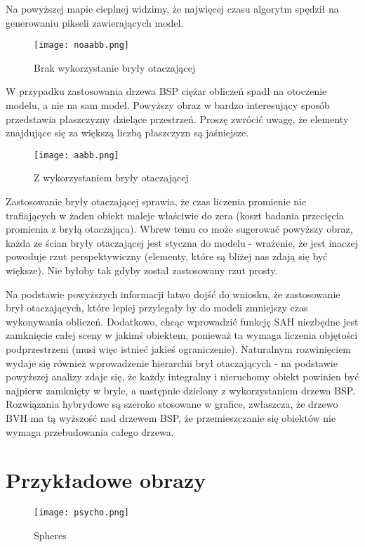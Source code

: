 Na powyższej mapie cieplnej widzimy, że najwięcej czasu algorytm spędził na generowaniu pikseli zawierających model.

\begin{figure}[h!]
\centering
  \caption{Brak wykorzystanie bryły otaczającej}
  \texttt{[image: noaabb.png]}
\end{figure}

W przypadku zastosowania drzewa BSP ciężar obliczeń spadł na otoczenie modelu, a nie na sam model. Powyższy obraz w bardzo interesujący sposób przedstawia płaszczyzny dzielące przestrzeń. Proszę zwrócić uwagę, że elementy znajdujące się za większą liczbą płaszczyzn są jaśniejsze. 

\begin{figure}[h!]
\centering
  \caption{Z wykorzystaniem bryły otaczającej}
  \texttt{[image: aabb.png]}
\end{figure}

Zastosowanie bryły otaczającej sprawia, że czas liczenia promienie nie trafiających w żaden obiekt maleje właściwie do zera (koszt badania przecięcia promienia z bryłą otaczająca). Wbrew temu co może sugerować powyższy obraz, każda ze ścian bryły otaczającej jest styczna do modelu - wrażenie, że jest inaczej powoduje rzut perspektywiczny (elementy, które są bliżej nas zdają się być większe). Nie byłoby tak gdyby został zastosowany rzut prosty.

Na podstawie powyższych informacji łatwo dojść do wniosku, że zastosowanie brył otaczających, które lepiej przylegały by do modeli zmniejszy czas wykonywania obliczeń. Dodatkowo, chcąc wprowadzić funkcję SAH niezbędne jest zamknięcie całej sceny w jakimś obiektem, ponieważ ta wymaga liczenia objętości podprzestrzeni (musi więc istnieć jakieś ograniczenie). Naturalnym rozwinięciem wydaje się również wprowadzenie hierarchii brył otaczających - na podstawie powyższej analizy zdaje się, że każdy integralny i nieruchomy obiekt powinien być najpierw zamknięty w bryle, a następnie dzielony z wykorzystaniem drzewa BSP. Rozwiązania hybrydowe są szeroko stosowane w grafice, zwłaszcza, że drzewo BVH ma tą wyższość nad drzewem BSP, że przemieszczanie się obiektów nie wymaga przebudowania całego drzewa.

\section{Przykładowe obrazy}


\begin{figure}[htb!]
\centering
  \caption{Spheres}
  \texttt{[image: psycho.png]}
\end{figure}


